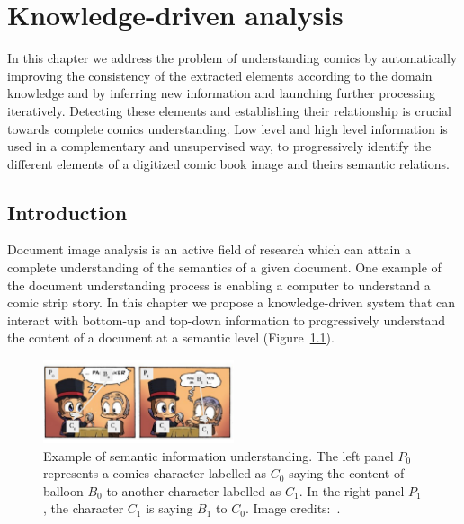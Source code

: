 \chapter{Knowledge-driven analysis}
\label{chap:knowledge}
\graphicspath{{./chapters/5-knowledge/figs/}}

In this chapter we address the problem of understanding comics by automatically improving the consistency of the extracted elements according to the domain knowledge and by inferring new information and launching further processing iteratively.
Detecting these elements and establishing their relationship is crucial towards complete comics understanding.
Low level and high level information is used in a complementary and unsupervised way, to progressively identify the different elements of a digitized comic book image and theirs semantic relations.


\section{Introduction}
\label{sec:kn:introduction}


Document image analysis is an active field of research which can attain a complete understanding of the semantics of a given document.
One example of the document understanding process is enabling a computer to understand a comic strip story.
In this chapter we propose a knowledge-driven system that can interact with bottom-up and top-down information to progressively understand the content of a document at a semantic level (Figure~\ref{fig:kn:intro_illustration}).

 \begin{figure}[ht]  %
   \centering
  \includegraphics[trim= 0px 10px 3px 10px, clip, width=0.5\textwidth]{intro_illustration.pdf}
  \caption[Example of semantic information understanding]{Example of semantic information understanding. The left panel $P_0$ represents a comics character labelled as $C_0$ saying the content of balloon $B_0$ to another character labelled as $C_1$. In the right panel $P_1$, the character $C_1$ is saying $B_1$ to $C_0$. Image credits:~\cite{Magicien11}. }
  \label{fig:kn:intro_illustration}
 \end{figure}


